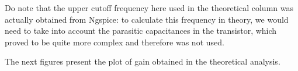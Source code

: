 Do note that the upper cutoff frequency here used in the theoretical column was actually obtained from Ngspice: to calculate this frequency in theory, we would need to take into account the parasitic capacitances in the transistor, which proved to be quite more complex and therefore was not used.


  The next figures present the plot of gain obtained in the theoretical analysis.






\pagebreak


